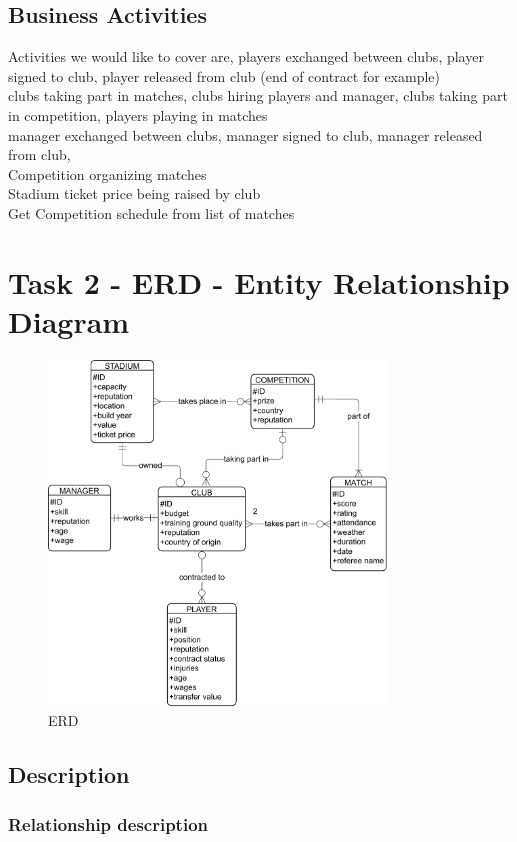 \documentclass{report}
\begin{document}
\section{Business Activities}
Activities we would like to cover are, players exchanged between clubs, player signed to club, player released from club (end of contract for example)
\\
clubs taking part in matches, clubs hiring players and manager, clubs taking part in competition, 
players playing in matches \\
manager exchanged between clubs, manager signed to club, manager released from club, \\ 
Competition organizing matches \\
Stadium ticket price being raised by club \\
Get Competition schedule from list of matches 

\chapter{Task 2 - ERD - Entity Relationship Diagram}
\begin{figure}[htpb]
    \centering
    \includegraphics[width=0.8\textwidth]{erd.pdf}
    \caption{ERD}
    \label{fig:tikzpgf}
\end{figure}

\section{Description}
\subsection{Relationship description}
\end{document}
